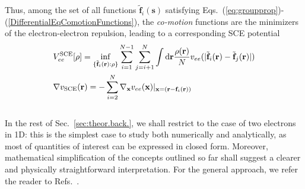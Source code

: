 \documentclass[aps,pra,twocolumn,superscriptaddress]{revtex4}
\begin{document}
Thus, among the set of all functions $\tilde{\textbf{f}}_i(\textbf{s})$ satisfying Eqs.~(\ref{eq:groupprop})-(\ref{DifferentialEqComotionFunctions}), the \textit{co-motion} functions are the minimizers of the electron-electron repulsion, leading to a corresponding SCE potential \cite{SeiGorSav-PRA-07,ColDiM-INC-13,SeiDiMGerNenGieGor-arxiv-17}
\begin{equation}\label{SCEWinf}
\begin{aligned}
& V_{ee}^{\rm SCE}[\rho]=\inf_{\lbrace\tilde{\textbf{f}}_i(\textbf{r}):\rho\rbrace}\sum_{i=1}^{N-1}\sum_{j=i+1}^N\int \text{\rm{d}}\textbf{r}\frac{\rho(\textbf{r})}{N}v_{ee}(\vert\tilde{\textbf{f}}_i(\textbf{r})-\tilde{\textbf{f}}_j(\textbf{r})\vert)\\&\nabla v_{\rm{SCE}}(\textbf{r})=-\sum_{i=2}^{N}\nabla_{\textbf{x}} v_{ee}(\textbf{x})\vert_{\textbf{x}=(\textbf{r}-\textbf{f}_i(\textbf{r}))}
\end{aligned}
\end{equation}
 \\In the rest of Sec.~\ref{sec:theor.back.}, we shall restrict to the case of two electrons in 1D: this is the simplest case to study both numerically and analytically, as most of quantities of interest can be expressed in closed form. Moreover, mathematical simplification of the concepts outlined so far shall suggest a clearer and physically straightforward interpretation. For the general approach, we refer the reader to Refs.~\citep{SeiGorSav-PRA-07,GorVigSei-JCTC-09}.
\end{document}
